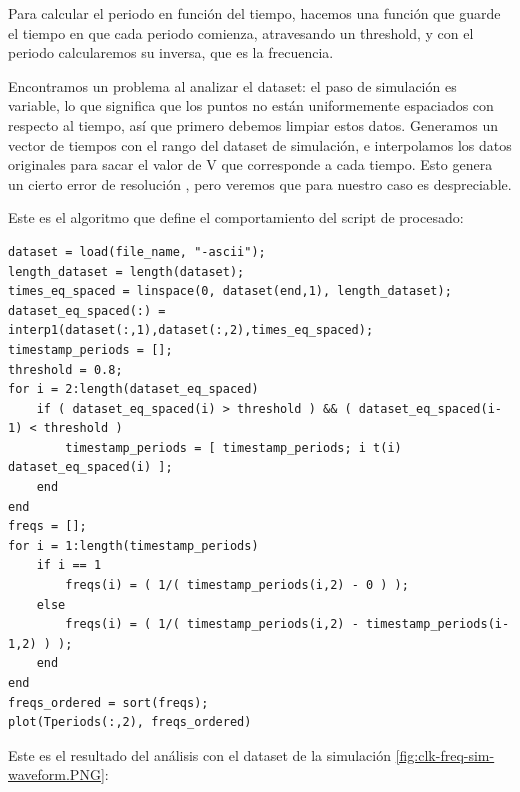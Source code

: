 \documentclass[12pt]{report} %
\begin{document}
	Para calcular el periodo en función del tiempo, hacemos una función que guarde el tiempo en que cada periodo comienza, atravesando un threshold, y con el periodo calcularemos su inversa, que es la frecuencia.
	
	Encontramos un problema al analizar el dataset: el paso de simulación es variable, lo que significa que los puntos no están uniformemente espaciados con respecto al tiempo, así que primero debemos limpiar estos datos. Generamos un vector de tiempos con el rango del dataset de simulación, e interpolamos los datos originales para sacar el valor de V que corresponde a cada tiempo. Esto genera un cierto error de resolución %
	, pero veremos que para nuestro caso es despreciable.
	
	Este es el algoritmo que define el comportamiento del script de procesado:
	
	\begin{lstlisting}
dataset = load(file_name, "-ascii");
length_dataset = length(dataset);
times_eq_spaced = linspace(0, dataset(end,1), length_dataset);
dataset_eq_spaced(:) = interp1(dataset(:,1),dataset(:,2),times_eq_spaced);
timestamp_periods = [];
threshold = 0.8;
for i = 2:length(dataset_eq_spaced)
	if ( dataset_eq_spaced(i) > threshold ) && ( dataset_eq_spaced(i-1) < threshold )
		timestamp_periods = [ timestamp_periods; i t(i) dataset_eq_spaced(i) ];
	end
end
freqs = [];
for i = 1:length(timestamp_periods)
	if i == 1
		freqs(i) = ( 1/( timestamp_periods(i,2) - 0 ) );
	else
		freqs(i) = ( 1/( timestamp_periods(i,2) - timestamp_periods(i-1,2) ) );
	end
end
freqs_ordered = sort(freqs);
plot(Tperiods(:,2), freqs_ordered)
	\end{lstlisting} 

	Este es el resultado del análisis con el dataset de la simulación \ref{fig:clk-freq-sim-waveform.PNG}:
	
\end{document}
